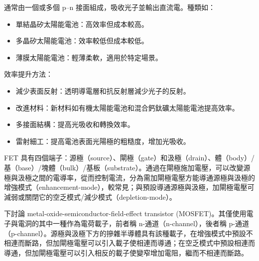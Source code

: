 \documentclass[a4paper,12pt]{article}
\begin{document}
通常由一個或多個 p–n 接面組成，吸收光子並輸出直流電。種類如：
\begin{itemize}
\item 單結晶矽太陽能電池：高效率但成本較高。
\item 多晶矽太陽能電池：效率較低但成本較低。
\item 薄膜太陽能電池：輕薄柔軟，適用於特定場景。
\end{itemize}
效率提升方法：
\begin{itemize}
\item 減少表面反射：透明導電層和抗反射層減少光子的反射。
\item 改進材料：新材料如有機太陽能電池和混合鈣鈦礦太陽能電池提高效率。
\item 多接面結構：提高光吸收和轉換效率。
\item 雷射細工：提高電池表面光陽極的粗糙度，增加光吸收。
\end{itemize}
FET 具有四個端子：源極（source）、閘極（gate）和汲極（drain）、體（body）/基（base）/塊體（bulk）/基板（substrate）。通過在閘極施加電壓，可以改變源極與汲極之間的電導率，從而控制電流，分為需加閘極電壓方能導通源極與汲極的增強模式（enhancement-mode），較常見；與預設導通源極與汲極，加閘極電壓可減弱或關閉它的空乏模式/減少模式（depletion-mode）。

下討論 metal-oxide-semiconductor-field-effect transistor (MOSFET)。其僅使用電子與電洞的其中一種作為電荷載子，前者稱 n-通道（n-channel），後者稱 p-通道（p-channel）。源極與汲極下方的摻雜半導體具有該種載子，在增強模式中預設不相連而斷路，但加閘極電壓可以引入載子使相連而導通；在空乏模式中預設相連而導通，但加閘極電壓可以引入相反的載子使變窄增加電阻，繼而不相連而斷路。
\end{document}
